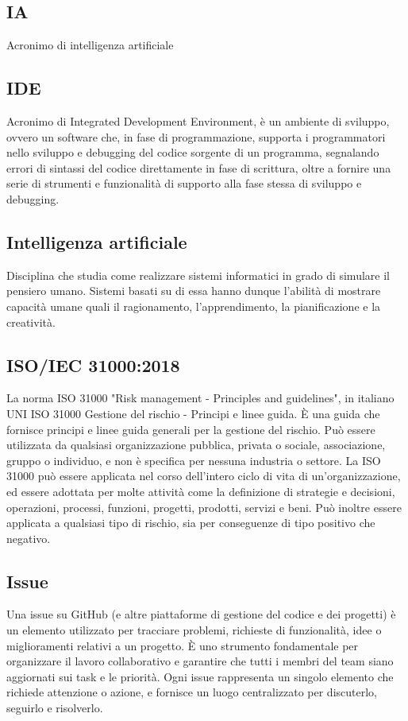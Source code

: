 \hypertarget{sec:ia}{}
\subsection*{IA}
Acronimo di intelligenza artificiale

\hypertarget{sec:ide}{}
\subsection*{IDE}
Acronimo di Integrated Development Environment, è un ambiente di sviluppo, ovvero un software che, in fase di programmazione, supporta i programmatori 
nello sviluppo e debugging del codice sorgente di un programma, segnalando errori di sintassi del codice direttamente in fase di scrittura, oltre a fornire 
una serie di strumenti e funzionalità di supporto alla fase stessa di sviluppo e debugging.

\hypertarget{sec:intelligenza_artificiale}{}
\subsection*{Intelligenza artificiale}
Disciplina che studia come realizzare sistemi informatici in grado di simulare il pensiero umano. Sistemi basati su di essa hanno dunque l'abilità di mostrare 
capacità umane quali il ragionamento, l'apprendimento, la pianificazione e la creatività.

\hypertarget{ISO/IEC 31000:2018}{}
\subsection*{ISO/IEC 31000:2018}
La norma ISO 31000 "Risk management - Principles and guidelines", 
in italiano UNI ISO 31000 Gestione del rischio - Principi e linee guida. 
È una guida che fornisce principi e linee guida generali per la gestione del rischio. 
Può essere utilizzata da qualsiasi organizzazione pubblica, privata o sociale, associazione, gruppo o individuo, e non è specifica per nessuna industria o settore.
La ISO 31000 può essere applicata nel corso dell'intero ciclo di vita di un'organizzazione, ed essere adottata per molte attività come la definizione di strategie e decisioni, operazioni, processi, funzioni, progetti, prodotti, servizi e beni.
Può inoltre essere applicata a qualsiasi tipo di rischio, sia per conseguenze di tipo positivo che negativo.

\subsection*{Issue}
Una issue su GitHub (e altre piattaforme di gestione del codice e dei progetti) è un elemento utilizzato per tracciare problemi, richieste di funzionalità, 
idee o miglioramenti relativi a un progetto. È uno strumento fondamentale per organizzare il lavoro collaborativo e garantire che tutti i membri del team 
siano aggiornati sui task e le priorità. Ogni issue rappresenta un singolo elemento che richiede attenzione o azione, e fornisce un luogo centralizzato per 
discuterlo, seguirlo e risolverlo.

\newpage